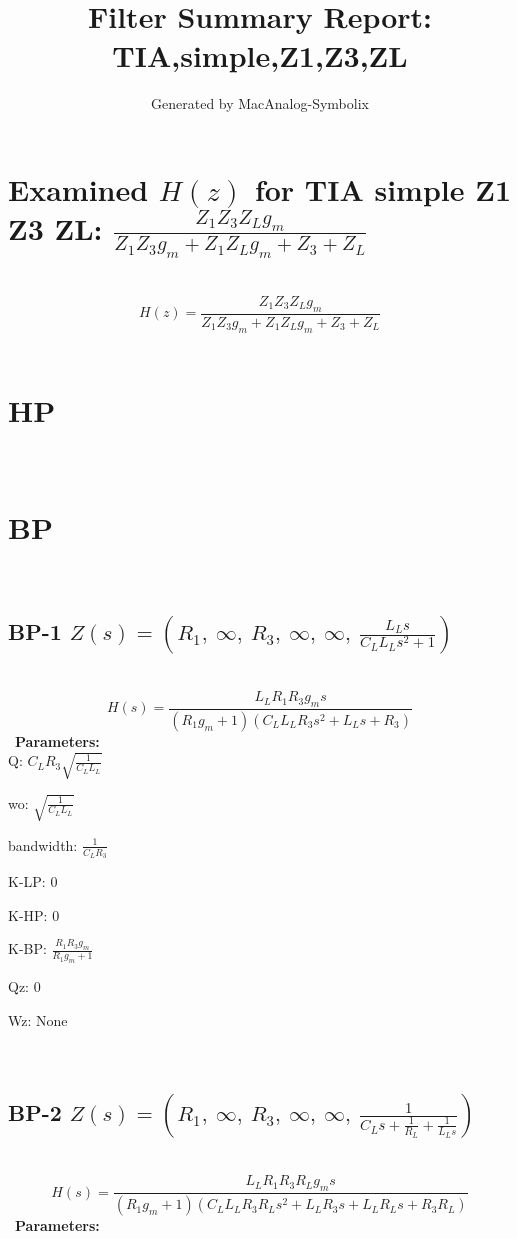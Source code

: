 \documentclass{article}
\begin{document}
        
                        \title{Filter Summary Report: TIA,simple,Z1,Z3,ZL}
                        \author{Generated by MacAnalog-Symbolix}
                        \maketitle

                        \tableofcontents
                        \newpage
                        \section{Examined $H(z)$ for TIA simple Z1 Z3 ZL: $\frac{Z_{1} Z_{3} Z_{L} g_{m}}{Z_{1} Z_{3} g_{m} + Z_{1} Z_{L} g_{m} + Z_{3} + Z_{L}}$ }\ 
\textbf{\[H(z) = \frac{Z_{1} Z_{3} Z_{L} g_{m}}{Z_{1} Z_{3} g_{m} + Z_{1} Z_{L} g_{m} + Z_{3} + Z_{L}}\] }\ 
\section{HP}\ 
\section{BP}\ 
\subsection{BP-1 $Z(s) = \left( R_{1}, \  \infty, \  R_{3}, \  \infty, \  \infty, \  \frac{L_{L} s}{C_{L} L_{L} s^{2} + 1}\right)$ } \ 
\textbf{\[H(s) = \frac{L_{L} R_{1} R_{3} g_{m} s}{\left(R_{1} g_{m} + 1\right) \left(C_{L} L_{L} R_{3} s^{2} + L_{L} s + R_{3}\right)}\] } \ 
\textbf{Parameters:}\\ 

Q: $C_{L} R_{3} \sqrt{\frac{1}{C_{L} L_{L}}}$\ 

wo: $\sqrt{\frac{1}{C_{L} L_{L}}}$\ 

bandwidth: $\frac{1}{C_{L} R_{3}}$\ 

K-LP: $0$\ 

K-HP: $0$\ 

K-BP: $\frac{R_{1} R_{3} g_{m}}{R_{1} g_{m} + 1}$\ 

Qz: $0$\ 

Wz: $\text{None}$\ 

\ 

\subsection{BP-2 $Z(s) = \left( R_{1}, \  \infty, \  R_{3}, \  \infty, \  \infty, \  \frac{1}{C_{L} s + \frac{1}{R_{L}} + \frac{1}{L_{L} s}}\right)$ } \ 
\textbf{\[H(s) = \frac{L_{L} R_{1} R_{3} R_{L} g_{m} s}{\left(R_{1} g_{m} + 1\right) \left(C_{L} L_{L} R_{3} R_{L} s^{2} + L_{L} R_{3} s + L_{L} R_{L} s + R_{3} R_{L}\right)}\] } \ 
\textbf{Parameters:}\\ 
\end{document}
